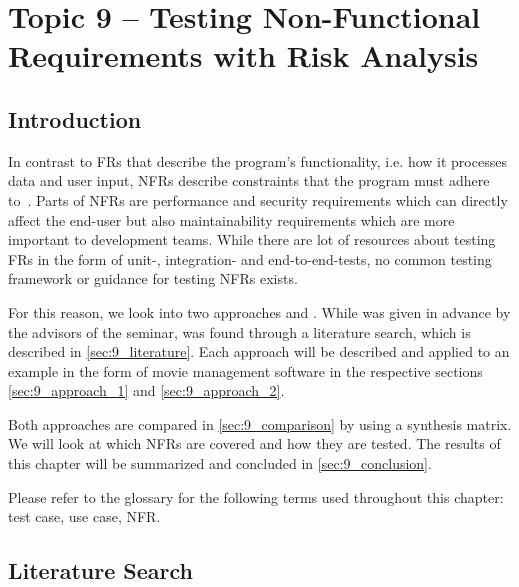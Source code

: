 %
%
%

\chapter{Topic 9 -- Testing Non-Functional Requirements with Risk Analysis}

\section{Introduction}

In contrast to \glspl{FR} that describe the program's functionality, i.e. how it processes data and user input, \glspl{NFR} describe constraints that the program must adhere to~\cite{SWEBOK}.
Parts of \glspl{NFR} are performance and security requirements which can directly affect the end-user but also maintainability requirements which are more important to development teams.
While there are lot of resources about testing \glspl{FR} in the form of unit-, integration- and end-to-end-tests, no common testing framework or guidance for testing \glspl{NFR} exists.

For this reason, we look into two approaches \cite{ZouPavlovski2008} and \cite{Lagerstedt2014}.
While \cite{ZouPavlovski2008} was given in advance by the advisors of the seminar, \cite{Lagerstedt2014} was found through a literature search, which is described in \autoref{sec:9_literature}.
Each approach will be described and applied to an example in the form of movie management software in the respective sections \ref{sec:9_approach_1} and \ref{sec:9_approach_2}. 

Both approaches are compared in \autoref{sec:9_comparison} by using a synthesis matrix. We will look at which \glspl{NFR} are covered and how they are tested.
The results of this chapter will be summarized and concluded in \autoref{sec:9_conclusion}.

Please refer to the glossary for the following terms used throughout this chapter:
test case, use case, NFR.




\section{Literature Search} \label{sec:9_literature}

